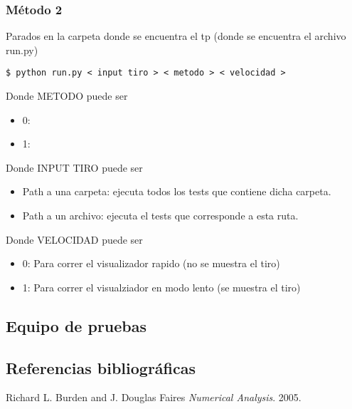\subsubsection{M\'etodo 2}
\begin{framed}
Parados en la carpeta donde se encuentra el tp (donde se encuentra el archivo run.py)
\begin{verbatim}
$ python run.py < input tiro > < metodo > < velocidad > 
\end{verbatim}
Donde METODO puede ser 
\begin{itemize}
	\item 0: 
	\item 1: 
\end{itemize}

Donde INPUT TIRO puede ser 
\begin{itemize}
	\item Path a una carpeta: ejecuta todos los tests que contiene dicha carpeta.
	\item Path a un archivo: ejecuta el tests que corresponde a esta ruta.
\end{itemize}

Donde VELOCIDAD puede ser 
\begin{itemize}
	\item 0: Para correr el visualizador rapido (no se muestra el tiro)
	\item 1: Para correr el visualziador en modo lento (se muestra el tiro)
\end{itemize}
\end{framed}



\subsection{Equipo de pruebas}
\subsection{Referencias bibliogr\'aficas}
\begin{thebibliography}{9}

  Richard L. Burden and J. Douglas Faires
  \emph{Numerical Analysis}.
  2005.
\end{thebibliography}
